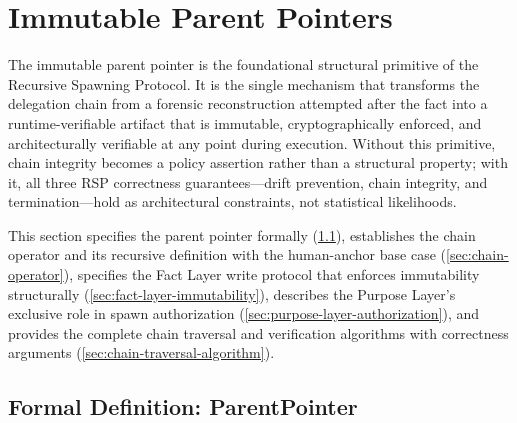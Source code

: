 \section{Immutable Parent Pointers}
\label{sec:immutable-parent-pointers}

The immutable parent pointer is the foundational structural primitive of the Recursive Spawning Protocol. It is the single mechanism that transforms the delegation chain from a forensic reconstruction attempted after the fact into a runtime-verifiable artifact that is immutable, cryptographically enforced, and architecturally verifiable at any point during execution. Without this primitive, chain integrity becomes a policy assertion rather than a structural property; with it, all three RSP correctness guarantees---drift prevention, chain integrity, and termination---hold as architectural constraints, not statistical likelihoods.

This section specifies the parent pointer formally (\ref{sec:parent-pointer-definition}), establishes the chain operator and its recursive definition with the human-anchor base case (\ref{sec:chain-operator}), specifies the Fact Layer write protocol that enforces immutability structurally (\ref{sec:fact-layer-immutability}), describes the Purpose Layer's exclusive role in spawn authorization (\ref{sec:purpose-layer-authorization}), and provides the complete chain traversal and verification algorithms with correctness arguments (\ref{sec:chain-traversal-algorithm}).

\subsection{Formal Definition: ParentPointer}
\label{sec:parent-pointer-definition}

